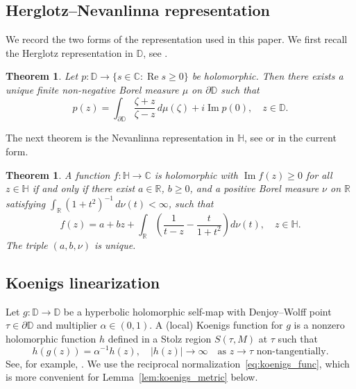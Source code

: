 \documentclass[10pt,a4paper]{amsart}
\numberwithin{equation}{section}
\newtheorem{theorem}[equation]{Theorem}
\begin{document}
\subsection{Herglotz--Nevanlinna representation}
\label{subsec:herglotz}

We record the two forms of the representation used in
this paper. We first recall the Herglotz representation in $\mathbb{D}$, see
{\cite[Theorem~2.1.1]{bracci2020}}.

\begin{theorem}
\label{thm:herglotz_disk}
Let $p:\mathbb{D}\to\{s\in\mathbb{C}:\operatorname{Re}s\ge 0\}$
be holomorphic.
Then there exists a unique finite non-negative Borel measure
$\mu$ on $\partial\mathbb{D}$ such that
\begin{equation*}
p(z)
=\int_{\partial\mathbb{D}}\frac{\zeta+z}{\zeta-z}\,d\mu(\zeta)
 +i\operatorname{Im}p(0),
\quad z\in\mathbb{D}.
\end{equation*}
\end{theorem}

The next theorem is the Nevanlinna representation in $\mathbb{H}$, see
{\cite{Nev} or \cite{Cau} in the current form}.
\begin{theorem}
\label{thm:nevanlinna}
A function $f:\mathbb{H}\to\mathbb{C}$ is holomorphic with
$\operatorname{Im}f(z)\ge 0$ for all $z\in\mathbb{H}$
if and only if there exist $a\in\mathbb{R}$, $b\ge 0$,
and a positive Borel measure $\nu$ on $\mathbb{R}$
satisfying $\int_{\mathbb{R}}(1+t^2)^{-1}\,d\nu(t)<\infty$,
such that
\begin{equation}
\label{eq:nevanlinna_rep}
f(z)
=a+bz
+\int_{\mathbb{R}}
  \left(\frac{1}{t-z}-\frac{t}{1+t^2}\right)d\nu(t),
\quad z\in\mathbb{H}.
\end{equation}
The triple $(a,b,\nu)$ is unique.
\end{theorem}

\subsection{Koenigs linearization}
\label{subsec:koenigs}

Let $g:\mathbb{D}\to\mathbb{D}$ be a hyperbolic holomorphic self-map with
Denjoy--Wolff point $\tau\in\partial\mathbb{D}$ and
multiplier $\alpha\in(0,1)$.
A (local) Koenigs function for $g$ is a nonzero holomorphic
function $h$ defined in a Stolz region $S(\tau,M)$ at $\tau$ such that
\begin{equation}
\label{eq:koenigs_func}
h(g(z))=\alpha^{-1}h(z),
\quad
|h(z)|\to\infty
\quad\text{as } z\to\tau
\text{ non-tangentially}.
\end{equation}
See, for example, \cite[p.~271, Notes~9.9]{bracci2020}. We use the reciprocal
normalization~\eqref{eq:koenigs_func}, which is more convenient for
Lemma~\ref{lem:koenigs_metric} below.
\end{document}
